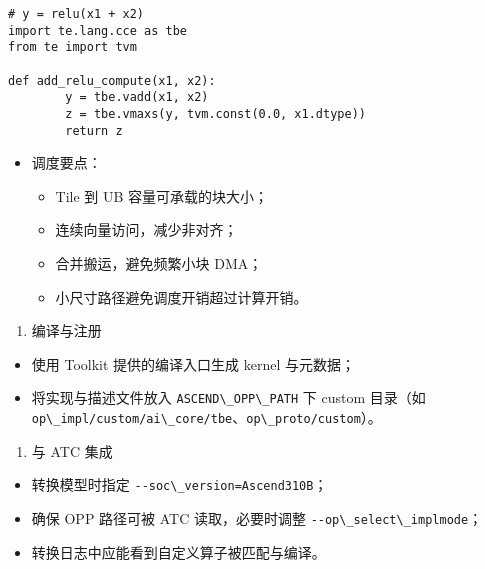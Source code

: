 \begin{lstlisting}
# y = relu(x1 + x2)
import te.lang.cce as tbe
from te import tvm

def add_relu_compute(x1, x2):
        y = tbe.vadd(x1, x2)
        z = tbe.vmaxs(y, tvm.const(0.0, x1.dtype))
        return z
\end{lstlisting}

\begin{itemize}
\tightlist
\item
  调度要点：

  \begin{itemize}
  \tightlist
  \item
    Tile 到 UB 容量可承载的块大小；
  \item
    连续向量访问，减少非对齐；
  \item
    合并搬运，避免频繁小块 DMA；
  \item
    小尺寸路径避免调度开销超过计算开销。
  \end{itemize}
\end{itemize}

\begin{enumerate}
\def\labelenumi{\arabic{enumi}.}
\setcounter{enumi}{3}
\tightlist
\item
  编译与注册
\end{enumerate}

\begin{itemize}
\tightlist
\item
  使用 Toolkit 提供的编译入口生成 kernel 与元数据；
\item
  将实现与描述文件放入 \passthrough{\lstinline!ASCEND\_OPP\_PATH!} 下
  custom 目录（如
  \passthrough{\lstinline!op\_impl/custom/ai\_core/tbe!}、\passthrough{\lstinline!op\_proto/custom!}）。
\end{itemize}

\begin{enumerate}
\def\labelenumi{\arabic{enumi}.}
\setcounter{enumi}{4}
\tightlist
\item
  与 ATC 集成
\end{enumerate}

\begin{itemize}
\tightlist
\item
  转换模型时指定 \passthrough{\lstinline!--soc\_version=Ascend310B!}；
\item
  确保 OPP 路径可被 ATC 读取，必要时调整
  \passthrough{\lstinline!--op\_select\_implmode!}；
\item
  转换日志中应能看到自定义算子被匹配与编译。
\end{itemize}

